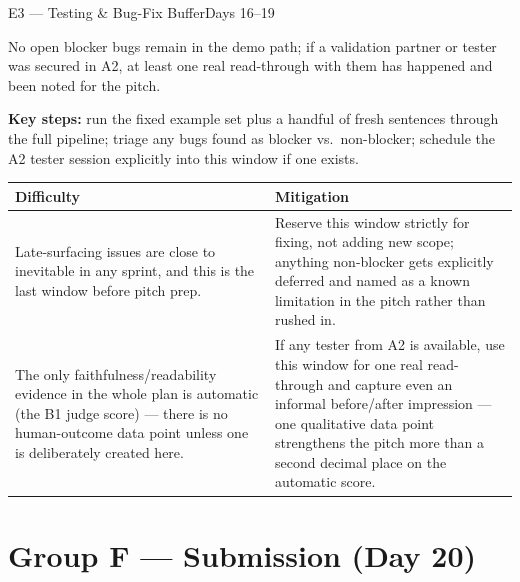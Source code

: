 \documentclass[11pt,a4paper]{article}
\begin{document}
\vspace{6pt}
\begin{milestonehead}{E3 --- Testing \& Bug-Fix Buffer}{Days 16--19}
\begin{goalbox}
No open blocker bugs remain in the demo path; if a validation partner or
tester was secured in A2, at least one real read-through with them has
happened and been noted for the pitch.
\end{goalbox}

\textbf{Key steps:} run the fixed example set plus a handful of fresh
sentences through the full pipeline; triage any bugs found as blocker vs.\
non-blocker; schedule the A2 tester session explicitly into this window if
one exists.

\begin{center}
\small
\begin{tabular}{@{}p{6.3cm}p{6.9cm}@{}}
\toprule
\textbf{Difficulty} & \textbf{Mitigation} \\
\midrule
Late-surfacing issues are close to inevitable in any sprint, and this is
the last window before pitch prep. & Reserve this window strictly for
fixing, not adding new scope; anything non-blocker gets explicitly deferred
and named as a known limitation in the pitch rather than rushed in. \\
\addlinespace
The only faithfulness/readability evidence in the whole plan is automatic
(the B1 judge score) --- there is no human-outcome data point unless one is
deliberately created here. & If any tester from A2 is available, use this
window for one real read-through and capture even an informal
before/after impression --- one qualitative data point strengthens the
pitch more than a second decimal place on the automatic score. \\
\bottomrule
\end{tabular}
\end{center}
\end{milestonehead}

\newpage
\section{Group F --- Submission (Day 20)}
\end{document}

